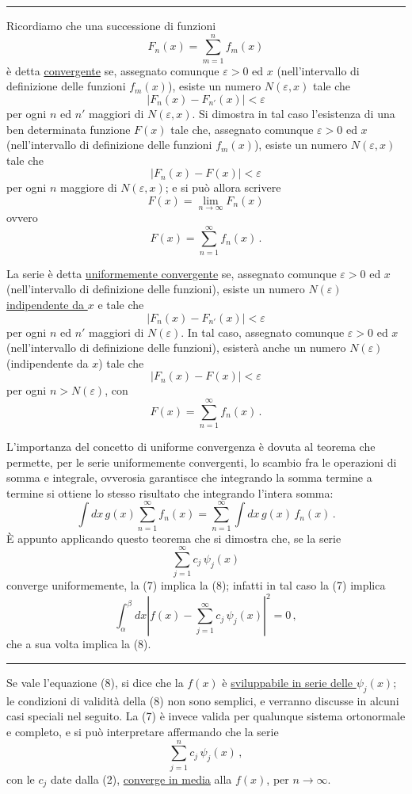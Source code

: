 \documentclass[11pt, a4paper]{book}
\numberwithin{equation}{section}
\begin{document}
\hrule
\medskip
Ricordiamo che una successione di funzioni
\[
F_n(x)=\sum_{m=1}^{n}f_m(x)
\]
è detta \uline{convergente} se, assegnato comunque $\varepsilon>0$ ed $x$ (nell'intervallo di definizione delle funzioni $f_m(x)$), esiste un numero $N(\varepsilon,x)$ tale che
\[
|F_n(x)-F_{n'}(x)|<\varepsilon
\]
per ogni $n$ ed $n'$ maggiori di $N(\varepsilon,x)$. Si dimostra in tal caso l'esistenza di una ben determinata funzione $F(x)$ tale che, assegnato comunque $\varepsilon>0$ ed $x$ (nell'intervallo di definizione delle funzioni $f_m(x)$), esiste un numero $N(\varepsilon,x)$ tale che
\[
|F_n(x)-F(x)|<\varepsilon
\]
per ogni $n$ maggiore di $N(\varepsilon,x)$; e si può allora scrivere
\[
F(x)=\lim_{n\to\infty}F_n(x)
\]
ovvero
\[
F(x)=\sum_{n=1}^{\infty}f_n(x)\,.
\]

La serie è detta \uline{uniformemente convergente} se, assegnato comunque $\varepsilon>0$ ed $x$ (nell'intervallo di definizione delle funzioni), esiste un numero $N(\varepsilon)$ \uline{indipendente da $x$} e tale che
\[
|F_n(x)-F_{n'}(x)|<\varepsilon
\]
per ogni $n$ ed $n'$ maggiori di $N(\varepsilon)$. In tal caso, assegnato comunque $\varepsilon>0$ ed $x$ (nell'intervallo di definizione delle funzioni), esisterà anche un numero $N(\varepsilon)$ (indipendente da $x$) tale che
\[
|F_n(x)-F(x)|<\varepsilon
\]
per ogni $n>N(\varepsilon)$, con
\[
F(x)=\sum_{n=1}^{\infty}f_n(x)\,.
\]

L'importanza del concetto di uniforme convergenza è dovuta al teorema che permette, per le serie uniformemente convergenti, lo scambio fra le operazioni di somma e integrale, ovverosia garantisce che integrando la somma termine a termine si ottiene lo stesso risultato che integrando l'intera somma:
\[
\int dx\, g(x)\sum_{n=1}^{\infty}f_n(x)=\sum_{n=1}^{\infty}\int dx\, g(x)\,f_n(x)\,.
\]
È appunto applicando questo teorema che si dimostra che, se la serie
\[
\sum_{j=1}^{\infty}c_j\,\psi_j(x)
\]
converge uniformemente, la (7) implica la (8); infatti in tal caso la (7) implica
\[
\int_\alpha^\beta dx\left|f(x)-\sum_{j=1}^{\infty}c_j\,\psi_j(x)\right|^2=0\,,
\]
che a sua volta implica la (8).
\medskip\hrule\medskip

Se vale l'equazione (8), si dice che la $f(x)$ è \uline{sviluppabile in serie delle $\psi_j(x)$}; le condizioni di validità della (8) non sono semplici, e verranno discusse in alcuni casi speciali nel seguito. La (7) è invece valida per qualunque sistema ortonormale e completo, e si può interpretare affermando che la serie
\[
\sum_{j=1}^{n}c_j\,\psi_j(x)\,,
\]
con le $c_j$ date dalla (2), \uline{converge in media} alla $f(x)$, per $n\to\infty$.
\end{document}
